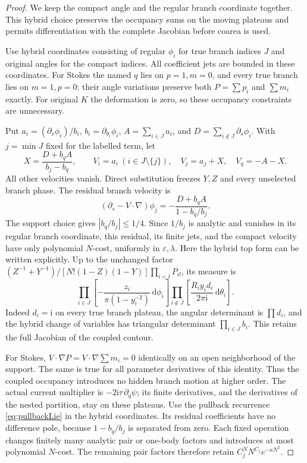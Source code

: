 \documentclass[11pt]{article}
\numberwithin{equation}{section}
\theoremstyle{definition}
\newcommand{\dd}{\,\mathrm d}
\newcommand{\ii}{\mathrm i}
\newcommand{\eps}{\varepsilon}
\begin{document}
\begin{proof}
We keep the compact angle and the regular branch coordinate together. This hybrid choice preserves the occupancy sums on the moving plateaus and permits differentiation with the complete Jacobian before coarea is used.

Use hybrid coordinates consisting of regular \(\phi_i\) for true
branch indices \(J\) and original angles for the compact indices.
All coefficient jets are bounded in these coordinates.
For Stokes the named \(q\) lies on \(p=1,m=0\), and every true
branch lies on \(m=1,p=0\); their angle variations preserve both
\(P=\sum p_i\) and \(\sum m_i\) exactly.
For original \(K\) the deformation is zero, so these occupancy
constraints are unnecessary.

Put \(a_i=(\partial_s\phi_i)/b_i\),
\(b_i=\partial_{\theta_i}\phi_i\),
\(A=\sum_{i\in J}a_i\), and
\(D=\sum_{i\notin J}\partial_s\phi_i\).
With \(j=\min J\) fixed for the labelled term, let
\[
 X=\frac{D+b_qA}{b_j-b_q},\qquad
 V_i=a_i\ (i\in J\setminus\{j\}),\quad
 V_j=a_j+X,\quad V_q=-A-X .
 \]
All other velocities vanish. Direct substitution freezes \(Y,Z\)
and every unselected branch phase. The residual branch velocity is
\[
 (\partial_s-V\cdot\nabla)\phi_j
       =-\frac{D+b_qA}{1-b_q/b_j}.
\]
The support choice gives \(|b_q/b_j|\le1/4\).
Since \(1/b_j\) is analytic and vanishes in its regular branch
coordinate, this residual, its finite jets, and the compact
velocity have only polynomial \(N\)-cost, uniformly in \(\eps,\lambda\).
Here the hybrid top form can be written explicitly. Up to the
unchanged factor \((Z^{-1}+Y^{-1})/[N!(1-Z)(1-Y)]\prod_{i<l}P_{il}\),
its measure is
\[
 \prod_{i\in J}\left[-\frac{z_i}{\pi(1-y_i^{-2})}\dd\phi_i\right]
 \prod_{i\notin J}\left[\frac{R_i y_i d_i}{2\pi\ii}\dd\theta_i\right].
\]
Indeed \(d_i=\ii\) on every true branch plateau, the angular
determinant is \(\prod d_i\), and the hybrid change of variables
has triangular determinant \(\prod_{i\in J}b_i\).
This retains the full Jacobian of the coupled contour.

For Stokes, \(V\cdot\nabla P=V\cdot\nabla\sum m_i=0\) identically
on an open neighborhood of the support. The same is true for
all parameter derivatives of this identity. Thus the coupled
occupancy introduces no hidden branch motion at higher order.
The actual current multiplier is
\(-2\ii\tau\,\partial_q\psi\); its finite derivatives, and the
derivatives of the nested partition, stay on these plateaus.
Use the pullback recurrence \eqref{eq:pullbackLie} in the hybrid
coordinates. Its residual coefficients have no difference pole,
because \(1-b_q/b_j\) is separated from zero. Each fixed operation
changes finitely many analytic pair or one-body factors and
introduces at most polynomial \(N\)-cost. The remaining pair
factors therefore retain
\(C_j^N N^{C_j}e^{-\kappa N^2}\).


\end{proof}
\end{document}
